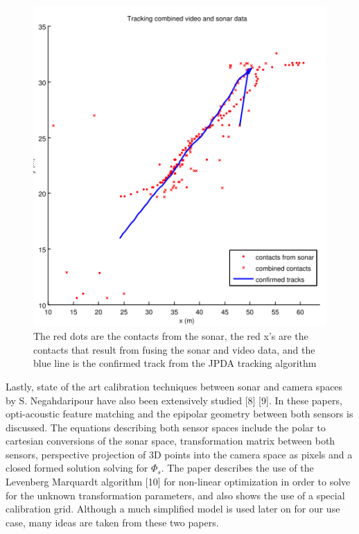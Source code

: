 \documentclass[a4paper]{IEEEtran}
\let\Phi\varPhi
\newcommand{\PhiSonar}{$\si{\Phi_{s}}$\xspace}
\begin{document}
\begin{figure}[h!]
  \centering
  \includegraphics[scale=0.4]{jdpa}
  \captionsetup{justification=centering}
  \caption{The red dots are the contacts from the sonar, the red x’s are the contacts that result from fusing the sonar and video data, and the blue line is the confirmed track from the JPDA tracking algorithm}
\end{figure}

Lastly, state of the art calibration techniques between sonar and camera spaces by S. Negahdaripour have also been extensively studied [8] [9]. In these papers, opti-acoustic feature matching and the epipolar geometry between both sensors is discussed. The equations describing both sensor spaces include the polar to cartesian conversions of the sonar space, transformation matrix between both sensors, perspective projection of 3D points into the camera space as pixels and a closed formed solution solving for \PhiSonar. The paper describes the use of the Levenberg Marquardt algorithm [10] for non-linear optimization in order to solve for the unknown transformation parameters, and also shows the use of a special calibration grid. Although a much simplified model is used later on for our use case, many ideas are taken from these two papers.
\end{document}
